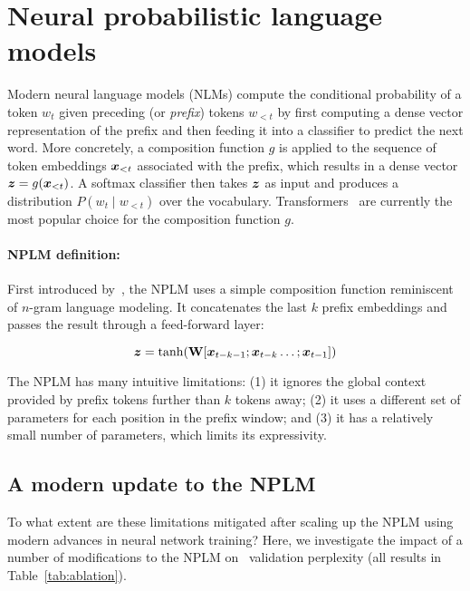 \documentclass[11pt]{article}
\begin{document}
%
 


\section{Neural probabilistic language models}

Modern neural language models (NLMs) compute the conditional probability of a token $w_t$ given preceding (or \emph{prefix}) tokens $w_{<t}$ by first computing a dense vector representation of the prefix and then feeding it into a classifier to predict the next word. More concretely, a composition function $g$ is applied to the sequence of token embeddings $\boldsymbol{x}_{<t}$ associated with the prefix, which results in a dense vector $\boldsymbol{z} = g(\boldsymbol{x}_{<t})$. A softmax classifier then takes $\boldsymbol{z}$ as input and produces a distribution $P(w_t \mid w_{<t})$ over the vocabulary. Transformers~\citep{NIPS2017_3f5ee243} are currently the most popular choice for the composition function $g$.







\paragraph{NPLM definition:} First introduced by~\citet{Bengio2003ANP}, the NPLM uses a simple composition function reminiscent of $n$-gram language modeling. It concatenates the last $k$ prefix embeddings and passes the result through a feed-forward layer:

\begin{equation}
    \boldsymbol{z} = \tanh(\text{\textbf{W}}[\boldsymbol{x}_{t-k-1}; \boldsymbol{x}_{t-k} \dots ; \boldsymbol{x}_{t-1}])
    \label{eq:concat}
\end{equation}

The NPLM has many intuitive limitations: (1) it ignores the global context provided by prefix tokens further than $k$ tokens away; (2) it uses a different set of parameters for each position in the prefix window; and (3) it has a relatively small number of parameters, which limits its expressivity.

\subsection{A modern update to the NPLM}
To what extent are these limitations mitigated after scaling up the NPLM using modern advances in neural network training? Here, we investigate the impact of a number of modifications to the NPLM on 
\wtthree\ validation perplexity (all results in Table~\ref{tab:ablation}).
\end{document}
